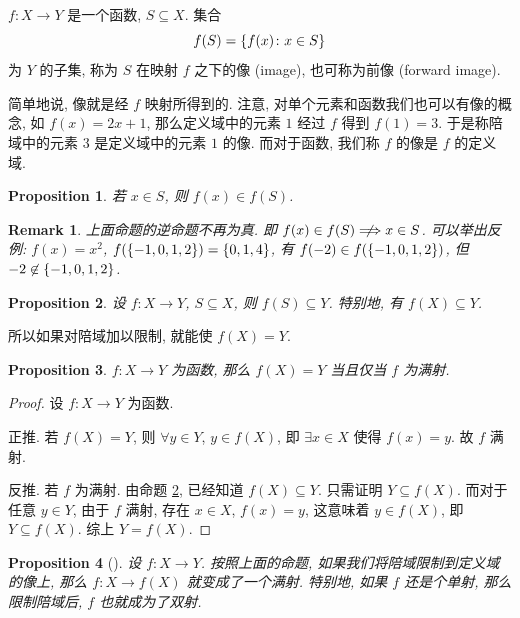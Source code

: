\documentclass[UTF8]{ctexart}
\theoremstyle{mystyle}
\newtheorem{proposition}{Proposition}[section]
\theoremstyle{myremark}
\newtheorem*{remark}{Remark}
\theoremstyle{plain}
\DeclarePairedDelimiter\set{\{}{\}}
\begin{document}
\begin{definition}
    $ f \colon X \to Y $ 是一个函数, $ S \subseteq X $. 集合 \[ f(S) = \set{f(x) \colon x \in S} \] 为 $ Y $ 的子集, 称为 $ S $ 在映射 $ f $ 之下的像 (image), 也可称为前像 (forward image).
\end{definition}

简单地说, 像就是经 $ f $ 映射所得到的. 注意, 对单个元素和函数我们也可以有像的概念, 如 $ f(x) = 2x + 1 $, 那么定义域中的元素 $ 1 $ 经过 $ f $ 得到 $ f(1) = 3 $. 于是称陪域中的元素 $ 3 $ 是定义域中的元素 $ 1 $ 的像. 而对于函数, 我们称 $ f $ 的像是 $ f $ 的定义域.

\begin{proposition}
    若 $ x \in S $, 则 $ f(x) \in f(S) $.
\end{proposition}

\begin{remark}
    上面命题的逆命题不再为真. 即 $ f(x) \in f(S) \centernot \Longrightarrow x \in S $. 可以举出反例: $ f(x) = x^2 $, $ f(\set{-1, 0, 1, 2}) = \set{0, 1, 4} $, 有 $ f(-2) \in f(\set{-1, 0, 1, 2}) $, 但 $ -2 \not\in \set{-1, 0, 1, 2} $.
\end{remark}
\begin{proposition} \label{image-subseteq-codomain}
    设 $ f \colon X \to Y $, $ S \subseteq X $, 则 $ f(S) \subseteq Y $. 特别地, 有 $ f(X) \subseteq Y $.
\end{proposition}

所以如果对陪域加以限制, 就能使 $ f(X) = Y $.

\begin{proposition} \label{image-surjection}
    $ f \colon X \to Y $ 为函数, 那么 $ f(X) = Y $ 当且仅当 $ f $ 为满射.
\end{proposition}

\begin{proof}
    设 $ f \colon X \to Y $ 为函数.

    正推. 若 $ f(X) = Y $, 则 $ \forall y \in Y $, $ y \in f(X) $, 即 $ \exists x \in X $ 使得 $ f(x) = y $. 故 $ f $ 满射.

    反推. 若 $ f $ 为满射. 由命题 \ref{image-subseteq-codomain}, 已经知道 $ f(X) \subseteq Y $. 只需证明 $ Y \subseteq f(X) $. 而对于任意 $ y \in Y $, 由于 $ f $ 满射, 存在 $ x \in X $, $ f(x) = y $, 这意味着 $ y \in f(X) $, 即 $ Y \subseteq f(X) $. 综上 $ Y = f(X) $.
\end{proof}

\begin{proposition}[]
    设 $ f \colon X \to Y $. 按照上面的命题, 如果我们将陪域限制到定义域的像上, 那么 $ f \colon X \to f(X) $ 就变成了一个满射. 特别地, 如果 $ f $ 还是个单射, 那么限制陪域后, $ f $ 也就成为了双射.
\end{proposition}
\end{document}

